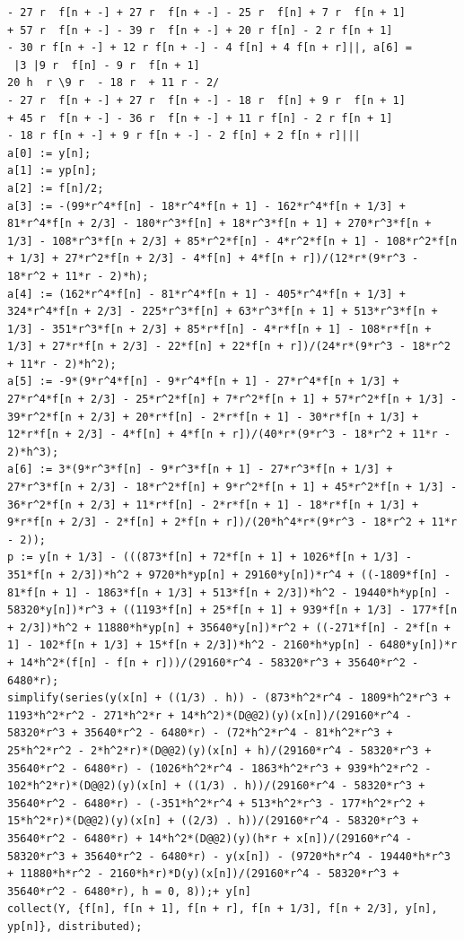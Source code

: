 \documentclass[12pt]{report}
\begin{document}
\begin{verbatim}
- 27 r  f[n + -] + 27 r  f[n + -] - 25 r  f[n] + 7 r  f[n + 1]
+ 57 r  f[n + -] - 39 r  f[n + -] + 20 r f[n] - 2 r f[n + 1]
- 30 r f[n + -] + 12 r f[n + -] - 4 f[n] + 4 f[n + r]||, a[6] = 
 |3 |9 r  f[n] - 9 r  f[n + 1]
20 h  r \9 r  - 18 r  + 11 r - 2/                              
- 27 r  f[n + -] + 27 r  f[n + -] - 18 r  f[n] + 9 r  f[n + 1]
+ 45 r  f[n + -] - 36 r  f[n + -] + 11 r f[n] - 2 r f[n + 1]
- 18 r f[n + -] + 9 r f[n + -] - 2 f[n] + 2 f[n + r]||| 
a[0] := y[n];
a[1] := yp[n];
a[2] := f[n]/2;
a[3] := -(99*r^4*f[n] - 18*r^4*f[n + 1] - 162*r^4*f[n + 1/3] + 81*r^4*f[n + 2/3] - 180*r^3*f[n] + 18*r^3*f[n + 1] + 270*r^3*f[n + 1/3] - 108*r^3*f[n + 2/3] + 85*r^2*f[n] - 4*r^2*f[n + 1] - 108*r^2*f[n + 1/3] + 27*r^2*f[n + 2/3] - 4*f[n] + 4*f[n + r])/(12*r*(9*r^3 - 18*r^2 + 11*r - 2)*h);
a[4] := (162*r^4*f[n] - 81*r^4*f[n + 1] - 405*r^4*f[n + 1/3] + 324*r^4*f[n + 2/3] - 225*r^3*f[n] + 63*r^3*f[n + 1] + 513*r^3*f[n + 1/3] - 351*r^3*f[n + 2/3] + 85*r*f[n] - 4*r*f[n + 1] - 108*r*f[n + 1/3] + 27*r*f[n + 2/3] - 22*f[n] + 22*f[n + r])/(24*r*(9*r^3 - 18*r^2 + 11*r - 2)*h^2);
a[5] := -9*(9*r^4*f[n] - 9*r^4*f[n + 1] - 27*r^4*f[n + 1/3] + 27*r^4*f[n + 2/3] - 25*r^2*f[n] + 7*r^2*f[n + 1] + 57*r^2*f[n + 1/3] - 39*r^2*f[n + 2/3] + 20*r*f[n] - 2*r*f[n + 1] - 30*r*f[n + 1/3] + 12*r*f[n + 2/3] - 4*f[n] + 4*f[n + r])/(40*r*(9*r^3 - 18*r^2 + 11*r - 2)*h^3);
a[6] := 3*(9*r^3*f[n] - 9*r^3*f[n + 1] - 27*r^3*f[n + 1/3] + 27*r^3*f[n + 2/3] - 18*r^2*f[n] + 9*r^2*f[n + 1] + 45*r^2*f[n + 1/3] - 36*r^2*f[n + 2/3] + 11*r*f[n] - 2*r*f[n + 1] - 18*r*f[n + 1/3] + 9*r*f[n + 2/3] - 2*f[n] + 2*f[n + r])/(20*h^4*r*(9*r^3 - 18*r^2 + 11*r - 2));
p := y[n + 1/3] - (((873*f[n] + 72*f[n + 1] + 1026*f[n + 1/3] - 351*f[n + 2/3])*h^2 + 9720*h*yp[n] + 29160*y[n])*r^4 + ((-1809*f[n] - 81*f[n + 1] - 1863*f[n + 1/3] + 513*f[n + 2/3])*h^2 - 19440*h*yp[n] - 58320*y[n])*r^3 + ((1193*f[n] + 25*f[n + 1] + 939*f[n + 1/3] - 177*f[n + 2/3])*h^2 + 11880*h*yp[n] + 35640*y[n])*r^2 + ((-271*f[n] - 2*f[n + 1] - 102*f[n + 1/3] + 15*f[n + 2/3])*h^2 - 2160*h*yp[n] - 6480*y[n])*r + 14*h^2*(f[n] - f[n + r]))/(29160*r^4 - 58320*r^3 + 35640*r^2 - 6480*r);
simplify(series(y(x[n] + ((1/3) . h)) - (873*h^2*r^4 - 1809*h^2*r^3 + 1193*h^2*r^2 - 271*h^2*r + 14*h^2)*(D@@2)(y)(x[n])/(29160*r^4 - 58320*r^3 + 35640*r^2 - 6480*r) - (72*h^2*r^4 - 81*h^2*r^3 + 25*h^2*r^2 - 2*h^2*r)*(D@@2)(y)(x[n] + h)/(29160*r^4 - 58320*r^3 + 35640*r^2 - 6480*r) - (1026*h^2*r^4 - 1863*h^2*r^3 + 939*h^2*r^2 - 102*h^2*r)*(D@@2)(y)(x[n] + ((1/3) . h))/(29160*r^4 - 58320*r^3 + 35640*r^2 - 6480*r) - (-351*h^2*r^4 + 513*h^2*r^3 - 177*h^2*r^2 + 15*h^2*r)*(D@@2)(y)(x[n] + ((2/3) . h))/(29160*r^4 - 58320*r^3 + 35640*r^2 - 6480*r) + 14*h^2*(D@@2)(y)(h*r + x[n])/(29160*r^4 - 58320*r^3 + 35640*r^2 - 6480*r) - y(x[n]) - (9720*h*r^4 - 19440*h*r^3 + 11880*h*r^2 - 2160*h*r)*D(y)(x[n])/(29160*r^4 - 58320*r^3 + 35640*r^2 - 6480*r), h = 0, 8));+ y[n]
collect(Y, {f[n], f[n + 1], f[n + r], f[n + 1/3], f[n + 2/3], y[n], yp[n]}, distributed);


\end{verbatim}
\end{document}

